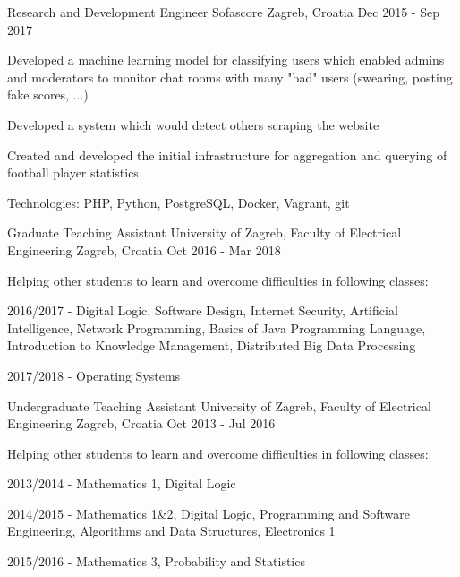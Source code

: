 \begin{cventries}
  \cventry
    {Research and Development Engineer} %
    {Sofascore} %
    {Zagreb, Croatia} %
    {Dec 2015 - Sep 2017} %
    {
      \begin{cvitems} %
        \item {Developed a machine learning model for classifying users which enabled admins and moderators to monitor chat rooms with many "bad" users (swearing, posting fake scores, ...)}
        \item {Developed a system which would detect others scraping the website}
        \item {Created and developed the initial infrastructure for aggregation and querying of football player statistics}
        \item {Technologies: PHP, Python, PostgreSQL, Docker, Vagrant, git}
      \end{cvitems}
    }

  \cventry
    {Graduate Teaching Assistant} %
    {University of Zagreb, Faculty of Electrical Engineering} %
    {Zagreb, Croatia} %
    {Oct 2016 - Mar 2018} %
    {
      \begin{cvitems} %
        \item {Helping other students to learn and overcome difficulties in following classes:}
        \item {2016/2017 - Digital Logic, Software Design, Internet Security, Artificial Intelligence, Network Programming, Basics of Java Programming Language, Introduction to Knowledge Management, Distributed Big Data Processing}
        \item {2017/2018 - Operating Systems}
      \end{cvitems}
    }

  \cventry
    {Undergraduate Teaching Assistant} %
    {University of Zagreb, Faculty of Electrical Engineering} %
    {Zagreb, Croatia} %
    {Oct 2013 - Jul 2016} %
    {
      \begin{cvitems} %
        \item {Helping other students to learn and overcome difficulties in following classes:}
        \item {2013/2014 - Mathematics 1, Digital Logic}
        \item {2014/2015 - Mathematics 1\&2, Digital Logic, Programming and Software Engineering, Algorithms and Data Structures, Electronics 1}
        \item {2015/2016 - Mathematics 3, Probability and Statistics}
      \end{cvitems}
    }


\end{cventries}
